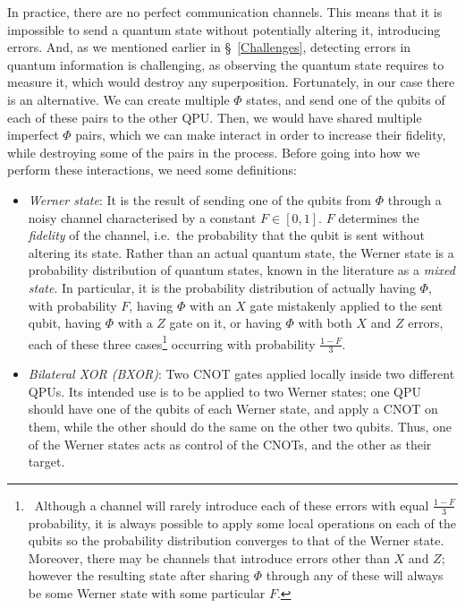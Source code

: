 In practice, there are no perfect communication channels. This means that it is impossible to send a quantum state without potentially altering it, introducing errors. And, as we mentioned earlier in \S~\ref{Challenges}, detecting errors in quantum information is challenging, as observing the quantum state requires to measure it, which would destroy any superposition. Fortunately, in our case there is an alternative. We can create multiple \(\Phi\) states, and send one of the qubits of each of these pairs to the other QPU. Then, we would have shared multiple imperfect \(\Phi\) pairs, which we can make interact in order to increase their fidelity, while destroying some of the pairs in the process. Before going into how we perform these interactions, we need some definitions:

\begin{itemize}
  \item \textit{Werner state}: It is the result of sending one of the qubits from \(\Phi\) through a noisy channel characterised by a constant \(F \in [0,1]\). \(F\) determines the \textit{fidelity} of the channel, i.e.\ the probability that the qubit is sent without altering its state. Rather than an actual quantum state, the Werner state is a probability distribution of quantum states, known in the literature as a \textit{mixed state}. In particular, it is the probability distribution of actually having \(\Phi\), with probability \(F\), having \(\Phi\) with an \(X\) gate mistakenly applied to the sent qubit, having \(\Phi\) with a \(Z\) gate on it, or having \(\Phi\) with both \(X\) and \(Z\) errors, each of these three cases\footnote{\, Although a channel will rarely introduce each of these errors with equal \(\frac{1-F}{3}\) probability, it is always possible to apply some local operations on each of the qubits so the probability distribution converges to that of the Werner state. Moreover, there may be channels that introduce errors other than \(X\) and \(Z\); however the resulting state after sharing \(\Phi\) through any of these will always be some Werner state with some particular \(F\).} occurring with probability \(\frac{1-F}{3}\).

  \item \textit{Bilateral XOR (BXOR)}: Two CNOT gates applied locally inside two different QPUs. Its intended use is to be applied to two Werner states; one QPU should have one of the qubits of each Werner state, and apply a CNOT on them, while the other should do the same on the other two qubits. Thus, one of the Werner states acts as control of the CNOTs, and the other as their target.
\end{itemize}

